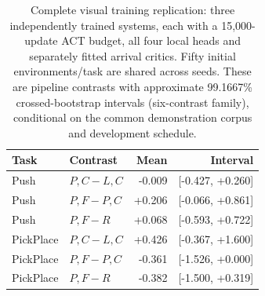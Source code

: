 \documentclass[10pt,a4paper]{article}
\begin{document}
\setcounter{table}{6}
\begin{table}[H]\centering\small
\caption{Complete visual training replication: three independently trained systems, each with a 15,000-update ACT budget, all four local heads and separately fitted arrival critics. Fifty initial environments/task are shared across seeds. These are pipeline contrasts with approximate 99.1667\% crossed-bootstrap intervals (six-contrast family), conditional on the common demonstration corpus and development schedule.}
\begin{tabular}{llrr}\toprule Task & Contrast & Mean & Interval\\\midrule
Push & $P,C-L,C$ & -0.009 & [-0.427, +0.260]\\
Push & $P,F-P,C$ & +0.206 & [-0.066, +0.861]\\
Push & $P,F-R$ & +0.068 & [-0.593, +0.722]\\
PickPlace & $P,C-L,C$ & +0.426 & [-0.367, +1.600]\\
PickPlace & $P,F-P,C$ & -0.361 & [-1.526, +0.000]\\
PickPlace & $P,F-R$ & -0.382 & [-1.500, +0.319]\\
\bottomrule\end{tabular}\end{table}
\end{document}
